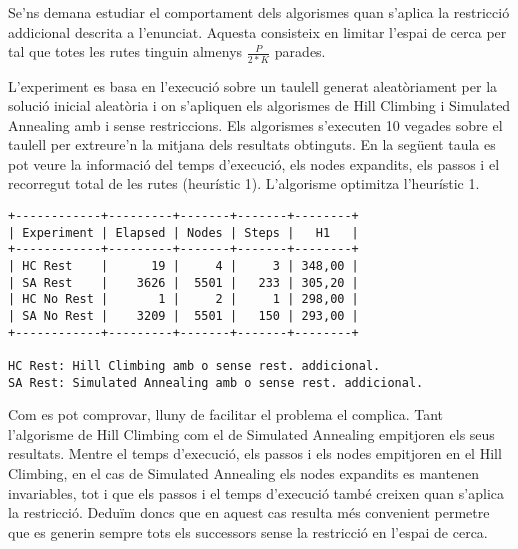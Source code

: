 
Se'ns demana estudiar el comportament dels algorismes quan s'aplica la restricció addicional descrita a l'enunciat. Aquesta consisteix en limitar l'espai de cerca per tal que totes les rutes tinguin almenys $\frac{P}{2*K}$ parades.

L'experiment es basa en l'execució sobre un taulell generat aleatòriament per la solució inicial aleatòria i on s'apliquen els algorismes de Hill Climbing i Simulated Annealing amb i sense restriccions. Els algorismes s'executen 10 vegades sobre el taulell per extreure'n la mitjana dels resultats obtinguts. En la següent taula es pot veure la informació del temps d'execució, els nodes expandits, els passos i el recorregut total de les rutes (heurístic 1). L'algorisme optimitza l'heurístic 1.

\begin{verbatim}
+------------+---------+-------+-------+--------+
| Experiment | Elapsed | Nodes | Steps |   H1   |
+------------+---------+-------+-------+--------+
| HC Rest    |      19 |     4 |     3 | 348,00 |
| SA Rest    |    3626 |  5501 |   233 | 305,20 |
| HC No Rest |       1 |     2 |     1 | 298,00 |
| SA No Rest |    3209 |  5501 |   150 | 293,00 |
+------------+---------+-------+-------+--------+
                                               
HC Rest: Hill Climbing amb o sense rest. addicional.
SA Rest: Simulated Annealing amb o sense rest. addicional.
\end{verbatim}  

Com es pot comprovar, lluny de facilitar el problema el complica. Tant l'algorisme de Hill Climbing com el de Simulated Annealing empitjoren els seus resultats. Mentre el temps d'execució, els passos i els nodes empitjoren en el Hill Climbing, en el cas de Simulated Annealing els nodes expandits es mantenen invariables, tot i que els passos i el temps d'execució també creixen quan s'aplica la restricció. Deduïm doncs que en aquest cas resulta més convenient permetre que es generin sempre tots els successors sense la restricció en l'espai de cerca.                                    